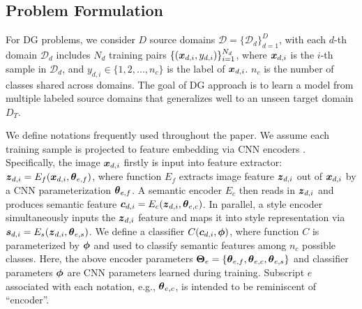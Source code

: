 \documentclass[10pt,twocolumn,letterpaper]{article}
\newcommand{\bc}{\mbox{\boldmath $c$}}
\newcommand{\bs}{\mbox{\boldmath $s$}}
\newcommand{\bx}{\mbox{\boldmath $x$}}
\newcommand{\bz}{\mbox{\boldmath $z$}}
\newcommand{\btheta}{\mbox{\boldmath $\theta$}}
\newcommand{\bphi}{\mbox{\boldmath $\phi$}}
\newcommand{\bTheta}{\mbox{\boldmath $\Theta$}}
\newcommand{\0}{{\bf 0}}
\begin{document}
\subsection{Problem Formulation} \label{sec:probform}
For DG problems, we consider $D$ source domains $\mathcal{D}=\{\mathcal{D}_{d}\}^{D}_{d=1}$, with each $d$-th domain $\mathcal{D}_{d}$ includes $N_{d}$ training pairs $\{(\bx_{d,i},y_{d,i})\}^{N_{d}}_{i=1}$, where $\bx_{d,i}$ is the $i$-th sample in $\mathcal{D}_{d}$, and $y_{d,i} \in \{1,2,...,n_c\}$ is the label of $\bx_{d,i}$. $n_c$ is the number of classes shared across domains. The goal of DG approach is to learn a model from multiple labeled source domains that generalizes well to an unseen target domain $D_T$.

We define notations frequently used throughout the paper. We assume each training sample is projected to feature embedding via CNN encoders \cite{he2016deep, li2021contextual}. Specifically, the image $\bx_{d,i}$ firstly is input into feature extractor: $\bz_{d,i}=E_{f}(\bx_{d,i}, \btheta_{e, f})$, where function $E_{f}$ extracts image feature $\bz_{d,i}$ out of $\bx_{d,i}$ by a CNN parameterization $\btheta_{e, f}$. A semantic encoder $E_{c}$ then reads in $\bz_{d,i}$ and produces semantic feature $\bc_{d,i}= E_{c}(\bz_{d,i}, \btheta_{e, c})$. In parallel, a style encoder simultaneously inputs the $\bz_{d,i}$ feature and maps it into style representation via $\bs_{d,i}=E_{s}(\bz_{d,i}, \btheta_{e, s})$. We define a classifier $C(\bc_{d,i}, \bphi)$, where function $C$ is parameterized by $\bphi$ and used to classify semantic features among $n_c$ possible classes. Here, the above encoder parameters $\bTheta_{e}=\{\btheta_{e, f},\btheta_{e, c},\btheta_{e, s}\}$ and classifier parameters $\bphi$ are CNN parameters learned during training. Subscript $e$ associated with each notation, e.g.,  $\btheta_{e, c}$, is intended to be reminiscent of ``encoder''.
\end{document}
